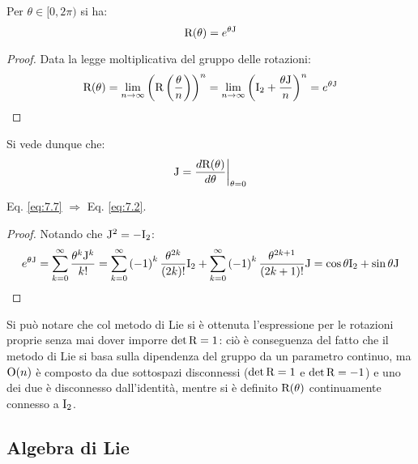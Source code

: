 \begin{proposition}
	Per $ \theta \in [0,2\pi) $ si ha:
	\begin{equation}
		\mathrm{R}(\theta) = e^{\theta \mathrm{J}}
		\label{eq:7.7}
	\end{equation}
\end{proposition}
\begin{proof}
	Data la legge moltiplicativa del gruppo delle rotazioni:
	\begin{equation*}
		\mathrm{R}(\theta) = \lim_{n \rightarrow \infty} \left( \mathrm{R}\left( \frac{\theta}{n} \right) \right)^n = \lim_{n \rightarrow \infty} \left( \mathrm{I}_2 + \frac{\theta \mathrm{J}}{n} \right)^n = e^{\theta \mathrm{J}}
	\end{equation*}
\end{proof}

Si vede dunque che:
\begin{equation}
	\mathrm{J} = \frac{d\mathrm{R}(\theta)}{d\theta} \bigg\vert_{\theta = 0}
	\label{eq:7.8}
\end{equation}

\begin{proposition}
	Eq. \ref{eq:7.7} $ \Rightarrow $ Eq. \ref{eq:7.2}.
\end{proposition}
\begin{proof}
	Notando che $ \mathrm{J}^2 = -\mathrm{I}_2 $:
	\begin{equation*}
		e^{\theta \mathrm{J}} = \sum_{k = 0}^{\infty} \frac{\theta^k \mathrm{J}^k}{k!} = \sum_{k = 0}^{\infty} \left( -1 \right)^k \frac{\theta^{2k}}{(2k)!} \mathrm{I}_2 + \sum_{k = 0}^{\infty} \left( -1 \right)^k \frac{\theta^{2k + 1}}{(2k + 1)!} \mathrm{J} = \cos \theta \mathrm{I}_2 + \sin \theta \mathrm{J}
	\end{equation*}
\end{proof}

Si può notare che col metodo di Lie si è ottenuta l'espressione per le rotazioni proprie senza mai dover imporre $ \det \mathrm{R} = 1 $: ciò è conseguenza del fatto che il metodo di Lie si basa sulla dipendenza del gruppo da un parametro continuo, ma $ \mathrm{O}(n) $ è composto da due sottospazi disconnessi ($ \det\mathrm{R} = 1 $ e $ \det\mathrm{R} = -1 $) e uno dei due è disconnesso dall'identità, mentre si è definito $ \mathrm{R}(\theta) $ continuamente connesso a $ \mathrm{I}_2 $.

\subsection{Algebra di Lie}

